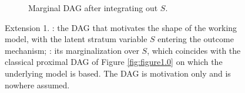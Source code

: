 \begin{figure}[H]
\begin{subfigure}[t]{0.48\textwidth}
\caption{Marginal DAG after integrating out $S$.}
\label{fig:figure2.1}
\end{subfigure}

\caption{Extension 1. : the DAG that motivates the shape of the working model, with the latent stratum variable $S$ entering the outcome mechanism; : its marginalization over $S$, which coincides with the classical proximal DAG of Figure \ref{fig:figure1.0} on which the underlying model is based. The DAG  is motivation only and is nowhere assumed.}

\end{figure}

